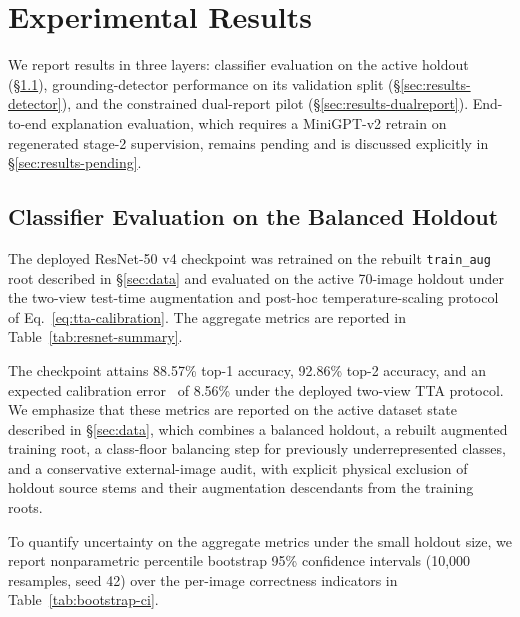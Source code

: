 \section{Experimental Results}
\label{sec:results}

We report results in three layers: classifier evaluation on the active
holdout (\S\ref{sec:results-classifier}), grounding-detector
performance on its validation split (\S\ref{sec:results-detector}), and
the constrained dual-report pilot (\S\ref{sec:results-dualreport}).
End-to-end explanation evaluation, which requires a MiniGPT-v2 retrain
on regenerated stage-2 supervision, remains pending and is discussed
explicitly in \S\ref{sec:results-pending}.

\subsection{Classifier Evaluation on the Balanced Holdout}
\label{sec:results-classifier}

The deployed ResNet-50 v4 checkpoint was retrained on the rebuilt
\texttt{train\_aug} root described in \S\ref{sec:data} and evaluated on
the active 70-image holdout under the two-view test-time augmentation
and post-hoc temperature-scaling protocol of
Eq.~\ref{eq:tta-calibration}. The aggregate metrics are reported in
Table~\ref{tab:resnet-summary}.

\begin{table}[H]
\centering
\caption{Aggregate holdout metrics for the deployed ResNet-50 v4
checkpoint on the active balanced 70-image holdout. ``Temperature''
refers to the value $T$ in Eq.~\ref{eq:tta-calibration}.}
\label{tab:resnet-summary}

\end{table}

The checkpoint attains 88.57\% top-1 accuracy, 92.86\% top-2 accuracy,
and an expected calibration error~\citep{naeini2015ece} of 8.56\% under
the deployed two-view TTA protocol. We emphasize that these metrics are
reported on the active dataset state described in \S\ref{sec:data},
which combines a balanced holdout, a rebuilt augmented training root, a
class-floor balancing step for previously underrepresented classes, and
a conservative external-image audit, with explicit physical exclusion of
holdout source stems and their augmentation descendants from the
training roots.

To quantify uncertainty on the aggregate metrics under the small holdout
size, we report nonparametric percentile bootstrap 95\% confidence
intervals (10{,}000 resamples, seed 42) over the per-image correctness
indicators in Table~\ref{tab:bootstrap-ci}.

